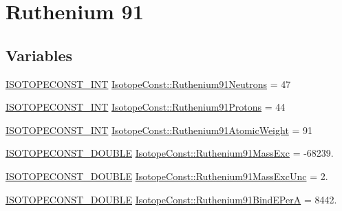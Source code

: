 \hypertarget{group___isotope_const-_ruthenium-_ru91}{}\section{Ruthenium 91}
\label{group___isotope_const-_ruthenium-_ru91}
\subsection*{Variables}
\begin{DoxyCompactItemize}
\item 
\mbox{\hyperlink{group___isotope_const-_macros_ga5f18360b3e99483a35c32d789e62621c}{I\+S\+O\+T\+O\+P\+E\+C\+O\+N\+S\+T\+\_\+\+I\+NT}} \mbox{\hyperlink{group___isotope_const-_ruthenium-_ru91_gae0fb5e0eb27559201e6bc97afbfccdbc}{Isotope\+Const\+::\+Ruthenium91\+Neutrons}} = 47
\item 
\mbox{\hyperlink{group___isotope_const-_macros_ga5f18360b3e99483a35c32d789e62621c}{I\+S\+O\+T\+O\+P\+E\+C\+O\+N\+S\+T\+\_\+\+I\+NT}} \mbox{\hyperlink{group___isotope_const-_ruthenium-_ru91_ga5cf4b83c3088cc2e5157c1dda2fd23fe}{Isotope\+Const\+::\+Ruthenium91\+Protons}} = 44
\item 
\mbox{\hyperlink{group___isotope_const-_macros_ga5f18360b3e99483a35c32d789e62621c}{I\+S\+O\+T\+O\+P\+E\+C\+O\+N\+S\+T\+\_\+\+I\+NT}} \mbox{\hyperlink{group___isotope_const-_ruthenium-_ru91_ga9b98a8b9ed4f1994cad0882c8cf04734}{Isotope\+Const\+::\+Ruthenium91\+Atomic\+Weight}} = 91
\item 
\mbox{\hyperlink{group___isotope_const-_macros_ga8f45a7272ce02c0b4c65c44636ed719a}{I\+S\+O\+T\+O\+P\+E\+C\+O\+N\+S\+T\+\_\+\+D\+O\+U\+B\+LE}} \mbox{\hyperlink{group___isotope_const-_ruthenium-_ru91_ga445bf575c99c96857451fd49070fa667}{Isotope\+Const\+::\+Ruthenium91\+Mass\+Exc}} = -\/68239.
\item 
\mbox{\hyperlink{group___isotope_const-_macros_ga8f45a7272ce02c0b4c65c44636ed719a}{I\+S\+O\+T\+O\+P\+E\+C\+O\+N\+S\+T\+\_\+\+D\+O\+U\+B\+LE}} \mbox{\hyperlink{group___isotope_const-_ruthenium-_ru91_ga9cbbf4c64f40ccd3061d6040c6e38c77}{Isotope\+Const\+::\+Ruthenium91\+Mass\+Exc\+Unc}} = 2.
\item 
\mbox{\hyperlink{group___isotope_const-_macros_ga8f45a7272ce02c0b4c65c44636ed719a}{I\+S\+O\+T\+O\+P\+E\+C\+O\+N\+S\+T\+\_\+\+D\+O\+U\+B\+LE}} \mbox{\hyperlink{group___isotope_const-_ruthenium-_ru91_ga612a3a6de3b406345c13777134a0e2b6}{Isotope\+Const\+::\+Ruthenium91\+Bind\+E\+PerA}} = 8442.
\item 

\end{DoxyCompactItemize}
